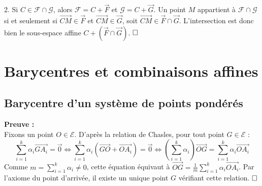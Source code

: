 \documentclass{article}
\begin{document}
2. Si $C \in \mathcal{F} \cap \mathcal{G}$, alors $\mathcal{F} = C + \vec{F}$ et $\mathcal{G} = C + \vec{G}$.
Un point $M$ appartient à $\mathcal{F} \cap \mathcal{G}$ si et seulement si $\overrightarrow{CM} \in \vec{F}$ et $\overrightarrow{CM} \in \vec{G}$, soit $\overrightarrow{CM} \in \vec{F} \cap \vec{G}$. L'intersection est donc bien le sous-espace affine $C + (\vec{F} \cap \vec{G})$. $\hfill \square$


\section{Barycentres et combinaisons affines}

\subsection{Barycentre d'un système de points pondérés}



\noindent \textbf{Preuve :}\\
Fixons un point $O \in \mathcal{E}$. D'après la relation de Chasles, pour tout point $G \in \mathcal{E}$ :
\[
    \sum_{i=1}^k \alpha_i \overrightarrow{GA_i} = \vec{0} \iff \sum_{i=1}^k \alpha_i \left( \overrightarrow{GO} + \overrightarrow{OA_i} \right) = \vec{0} \iff \left( \sum_{i=1}^k \alpha_i \right) \overrightarrow{OG} = \sum_{i=1}^k \alpha_i \overrightarrow{OA_i}
\]
Comme $m = \sum_{i=1}^k \alpha_i \neq 0$, cette équation équivaut à $\overrightarrow{OG} = \frac{1}{m} \sum_{i=1}^k \alpha_i \overrightarrow{OA_i}$.
Par l'axiome du point d'arrivée, il existe un unique point $G$ vérifiant cette relation. $\hfill \square$
\end{document}
